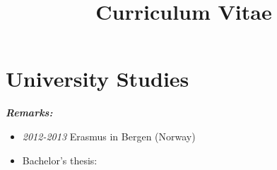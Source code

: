 \documentclass[11pt,a4paper,sans]{moderncv}        %
\title{Curriculum Vitae}                               %
\begin{document}
\makecvtitle

\iffalse
	\section{Pre - University Studies}
	\cventry{2008-2010}{Bachillerato Español}{Instituto Santa Clara}{Santander}{\textit{High School Studies}}{}  %
	\begin{itemize}
		\item{Final grade: 8.1/10 Including selectividad\footnote{National university entry exam} }
			\newline
	\end{itemize}
	\cventry{2008-2010}{International Baccalaureate}{Instituto Santa Clara}{Santander}{\textit{High School Studies}}{Studied simultaneously with "Bachillerato" and completed in two years following High School's schedule}
	\begin{itemize}
		\item Final grade: 31 pt
			\begin{itemize} 
				\item Including 6/7 in Physics
			\end{itemize}
	\end{itemize}
\fi

\section{University Studies}


\textit{\textbf{Remarks:}}
\begin{itemize}%
	\item \textit{2012-2013} Erasmus in Bergen (Norway)
	\item Bachelor's thesis: \newline{}

\end{itemize}
\end{document}
